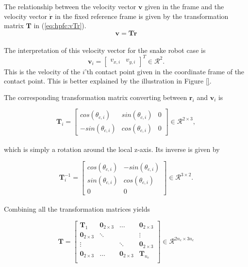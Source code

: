 The relationship between the velocity vector $\mathbf{v}$ given in the  frame and the velocity vector $\dot{\mathbf{r}}$ in the fixed reference frame is given by the transformation matrix $\mathbf{T}$ in (\ref{eq:hpfc:vTr}).
\begin{equation}\label{eq:hpfc:vTr}
    \mathbf{v = T\dot{r}}
\end{equation}
\\
The interpretation of this velocity vector for the snake robot case is
\begin{equation}
    \mathbf{v}_i = 
    \begin{bmatrix}
        v_{x,i} & v_{y,i}
    \end{bmatrix}^T \in \mathcal{R}^2.
\end{equation}
This is the velocity of the $i$'th contact point given in the coordinate frame of the contact point. This is better explained by the illustration in Figure \ref{}.

The corresponding transformation matrix converting between $\mathbf{r}_i$ and $\mathbf{v}_i$ is

\begin{equation} \label{eq:dhpfc_Ti}
    \mathbf{T}_i =
    \begin{bmatrix}
        cos(\theta_{c,i}) & sin(\theta_{c,i}) & 0 \\
        -sin(\theta_{c,i}) & cos(\theta_{c,i}) & 0
    \end{bmatrix} \in \mathcal{R}^{2 \times 3},
\end{equation}
\\
which is simply a rotation around the local z-axis. Its inverse is given by

\begin{equation}\label{eq:Tinv}
    \mathbf{T}^{-1}_i =
    \begin{bmatrix}
        cos(\theta_{c,i}) & -sin(\theta_{c,i}) \\
        sin(\theta_{c,i}) & cos(\theta_{c,i}) \\
        0 & 0
    \end{bmatrix} \in \mathcal{R}^{3 \times 2}.
\end{equation}
\\
Combining all the transformation matrices yields

\begin{equation}
    \mathbf{T} =
    \begin{bmatrix}
        \mathbf{T}_1 & \mathbf{0}_{2\times3} & \dots & \mathbf{0}_{2\times3} \\
        \mathbf{0}_{2\times3} & \ddots & & \vdots \\
        \vdots & & \ddots & \mathbf{0}_{2\times3} \\
        \mathbf{0}_{2\times3} & \dots & \mathbf{0}_{2\times3} & \mathbf{T}_{n_c} \\
    \end{bmatrix} \in \mathcal{R}^{2 n_c \times 3 n_c}
\end{equation}
\\

